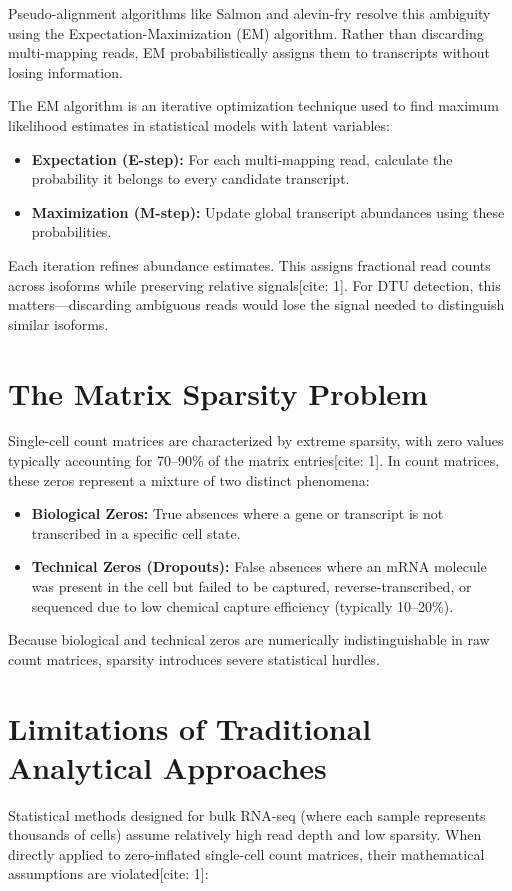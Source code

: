 Pseudo-alignment algorithms like Salmon and alevin-fry resolve this ambiguity using the Expectation-Maximization (EM) algorithm. Rather than discarding multi-mapping reads, EM probabilistically assigns them to transcripts without losing information.

The EM algorithm is an iterative optimization technique used to find maximum likelihood estimates in statistical models with latent variables:
\begin{itemize}
    \item \textbf{Expectation (E-step):} For each multi-mapping read, calculate the probability it belongs to every candidate transcript.
    \item \textbf{Maximization (M-step):} Update global transcript abundances using these probabilities.
\end{itemize}

Each iteration refines abundance estimates. This assigns fractional read counts across isoforms while preserving relative signals[cite: 1]. For DTU detection, this matters—discarding ambiguous reads would lose the signal needed to distinguish similar isoforms.

\section{The Matrix Sparsity Problem}
Single-cell count matrices are characterized by extreme sparsity, with zero values typically accounting for 70--90\% of the matrix entries[cite: 1]. In count matrices, these zeros represent a mixture of two distinct phenomena:
\begin{itemize}
    \item \textbf{Biological Zeros:} True absences where a gene or transcript is not transcribed in a specific cell state.
    \item \textbf{Technical Zeros (Dropouts):} False absences where an mRNA molecule was present in the cell but failed to be captured, reverse-transcribed, or sequenced due to low chemical capture efficiency (typically 10--20\%).
\end{itemize}

Because biological and technical zeros are numerically indistinguishable in raw count matrices, sparsity introduces severe statistical hurdles.

\section{Limitations of Traditional Analytical Approaches}
Statistical methods designed for bulk RNA-seq (where each sample represents thousands of cells) assume relatively high read depth and low sparsity. When directly applied to zero-inflated single-cell count matrices, their mathematical assumptions are violated[cite: 1]:

